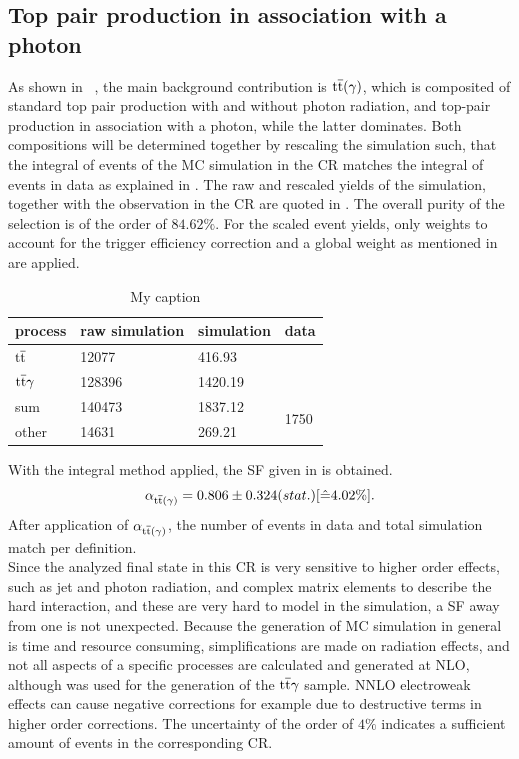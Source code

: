 \subsection{Top pair production in association with a photon}\label{sec:ttbar}
As shown in ~, the main background contribution is ${\mathrm{t}\overline{\mathrm{t}}}(\gamma)$, which is composited of standard top pair production with and without photon radiation, and top-pair production in association with a photon, while the latter dominates. Both compositions will be determined together by rescaling the simulation such, that the integral of events of the MC simulation in the CR matches the integral of events in data as explained in . The raw and rescaled yields of the simulation, together with the observation in the CR are quoted in . The overall purity of the selection is of the order of $84.62\%$. For the scaled event yields, only weights to account for the trigger efficiency correction and a global weight as mentioned in  are applied.
\begin{table}[tbp]
 \centering
 \caption{My caption}
 \label{tab:CRTT}
 \begin{tabular}{llll}
  
  process      & raw simulation & simulation & data                  \\\hline
  ${\mathrm{t}\overline{\mathrm{t}}}$     & 12077          & 416.93     &                       \\
  ${\mathrm{t}\overline{\mathrm{t}}}\gamma$ & 128396         & 1420.19    &                       \\\hline\hline
  sum          & 140473         & 1837.12    & \multirow{2}{*}{1750} \\
  other        & 14631          & 269.21     &                       
 \end{tabular}
\end{table}
With the integral method applied, the SF given in  is obtained.
\begin{equation}\label{eq:AlphaTT}
 \alpha_{{\mathrm{t}\overline{\mathrm{t}}}(\gamma)}=0.806 \pm 0.324 (stat.) [\hat{=}4.02\%].
\end{equation}
After application of $\alpha_{{\mathrm{t}\overline{\mathrm{t}}}(\gamma)}$, the number of events in data and total simulation match per definition.\\
Since the analyzed final state in this CR is very sensitive to higher order effects, such as jet and photon radiation, and complex matrix elements to describe the hard interaction, and these are very hard to model in the simulation, a SF away from one is not unexpected. Because the generation of MC simulation in general is time and resource consuming, simplifications are made on \eg radiation effects, and not all aspects of a specific processes are calculated and generated at NLO, although \AMCATNLO was used for the generation of the ${\mathrm{t}\overline{\mathrm{t}}}\gamma$ sample. NNLO electroweak effects can cause negative corrections for example due to destructive terms in higher order corrections. The uncertainty of the order of $4\%$ indicates a sufficient amount of events in the corresponding CR.\\
